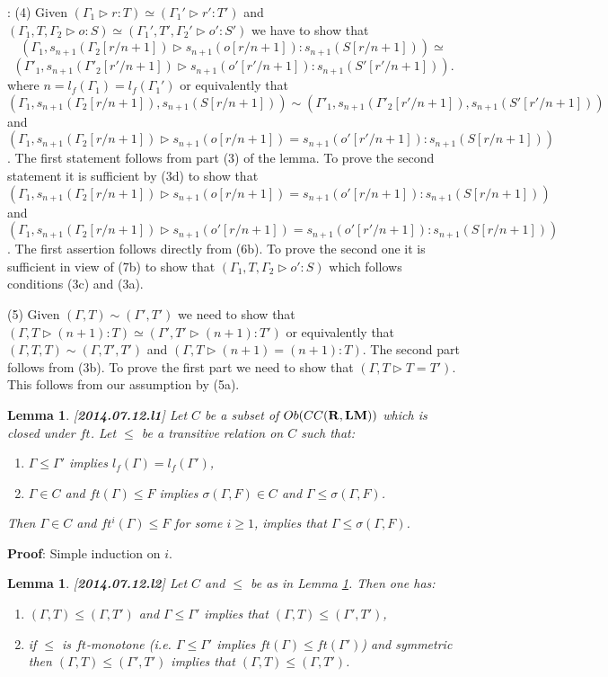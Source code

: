 \documentclass[11pt]{article}
\newenvironment{proof}{{\bf Proof}:}{\vskip 5mm }
\newtheorem{lemma}[proposition]{Lemma}
\newcommand{\llabel}[1]{\label{#1}[{\bf #1}]}
\newcommand{\rr}{{\bf R}}
\newcommand{\lm}{{\bf LM}}
\begin{document}
\begin{proof}
(4) Given $(\Gamma_1\rhd r:T)\simeq(\Gamma_1'\rhd r':T')$ and $(\Gamma_1,T,\Gamma_2\rhd o:S)\simeq(\Gamma_1',T',\Gamma_2'\rhd o':S')$ we have to show that 
%
$$(\Gamma_1,s_{n+1}(\Gamma_2[r/n+1])\rhd s_{n+1}(o[r/n+1]):s_{n+1}(S[r/n+1]))\simeq$$ 
$$ (\Gamma'_1,s_{n+1}(\Gamma'_2[r'/n+1])\rhd s_{n+1}(o'[r'/n+1]):s_{n+1}(S'[r'/n+1])).$$
%
%
where $n=l_f(\Gamma_1)=l_f(\Gamma_1')$ or equivalently that 
%
$$(\Gamma_1,s_{n+1}(\Gamma_2[r/n+1]),s_{n+1}(S[r/n+1]))\sim(\Gamma'_1,s_{n+1}(\Gamma'_2[r'/n+1]), s_{n+1}(S'[r'/n+1]))$$
%
and $(\Gamma_1,s_{n+1}(\Gamma_2[r/n+1])\rhd s_{n+1}(o[r/n+1])=s_{n+1}(o'[r'/n+1]):s_{n+1}(S[r/n+1]))$. The first statement follows from part (3) of the lemma. To prove the second statement it is sufficient by (3d) to show that  $(\Gamma_1,s_{n+1}(\Gamma_2[r/n+1])\rhd s_{n+1}(o[r/n+1])=s_{n+1}(o'[r/n+1]):s_{n+1}(S[r/n+1]))$ and  $(\Gamma_1,s_{n+1}(\Gamma_2[r/n+1])\rhd s_{n+1}(o'[r/n+1])=s_{n+1}(o'[r'/n+1]):s_{n+1}(S[r/n+1]))$. The first assertion follows directly from (6b). To prove the second one it is sufficient in view of (7b) to show that $(\Gamma_1,T,\Gamma_2\rhd o':S)$ which follows conditions (3c) and (3a).

(5) Given $(\Gamma,T)\sim(\Gamma',T')$ we need to show that $(\Gamma,T\rhd (n+1):T)\simeq(\Gamma',T'\rhd (n+1):T')$ or equivalently that $(\Gamma,T,T)\sim(\Gamma,T',T')$ and $(\Gamma,T\rhd (n+1)=(n+1):T)$. The second part follows from (3b). To prove the first part we need to show that $(\Gamma,T\rhd T=T')$. This follows from our assumption by (5a). 
\end{proof}
%
\begin{lemma}
\llabel{2014.07.12.l1}
Let $C$ be a subset of $Ob(CC(\rr,\lm))$ which is closed under $ft$. Let $\le$ be a transitive relation on $C$ such that:
%
\begin{enumerate}
\item $\Gamma\le \Gamma'$ implies $l_f(\Gamma)=l_f(\Gamma')$,
\item $\Gamma\in C$ and $ft(\Gamma)\le F$ implies $\sigma(\Gamma,F)\in C$ and $\Gamma\le \sigma(\Gamma,F)$.
\end{enumerate}
%
Then $\Gamma\in C$ and $ft^i(\Gamma)\le F$ for some $i\ge 1$, implies that $\Gamma\le \sigma(\Gamma,F)$. 
\end{lemma}
%
\begin{proof}
Simple induction on $i$.
\end{proof}
%
\begin{lemma}
\llabel{2014.07.12.l2}
Let $C$ and $\le$ be as in Lemma \ref{2014.07.12.l1}. Then one has:
%
\begin{enumerate}
\item $(\Gamma,T)\le (\Gamma,T')$ and $\Gamma\le \Gamma'$ implies that $(\Gamma,T)\le (\Gamma',T')$,
\item if $\le$ is $ft$-monotone (i.e. $\Gamma\le \Gamma'$ implies $ft(\Gamma)\le ft(\Gamma')$) and symmetric then $(\Gamma,T)\le (\Gamma',T')$ implies that $(\Gamma,T)\le (\Gamma,T')$.
\end{enumerate}
\end{lemma}
\end{document}

